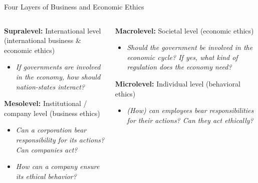 \documentclass[aspectratio=169, 10pt]{beamer}
\begin{document}
\begin{frame}{Four Layers of Business and Economic Ethics}

\begin{columns}[T,onlytextwidth]
  \begin{column}{0.48\textwidth}
    \textcolor{WHUblue}{\textbf{Supralevel:}} International level (international business \& economic ethics)
    \begin{itemize}
      \item \textit{If governments are involved in the economy, how should nation-states interact?}
    \end{itemize}
    \vspace{1em}
    \textcolor{WHUblue}{\textbf{Mesolevel:}} Institutional / company level (business ethics)
    \begin{itemize}
      \item \textit{Can a corporation bear responsibility for its actions? Can companies act?}
      \item \textit{How can a company ensure its ethical behavior?}
    \end{itemize}
  \end{column}
  \begin{column}{0.48\textwidth}
    \textcolor{WHUblue}{\textbf{Macrolevel:}} Societal level (economic ethics)
    \begin{itemize}
      \item \textit{Should the government be involved in the economic cycle? If yes, what kind of regulation does the economy need?}
    \end{itemize}
    \vspace{2em}
    \textcolor{WHUblue}{\textbf{Microlevel:}} Individual level (behavioral ethics)
    \begin{itemize}
      \item \textit{(How) can employees bear responsibilities for their actions? Can they act ethically?}
    \end{itemize}
  \end{column}
\end{columns}

\end{frame}
\end{document}
